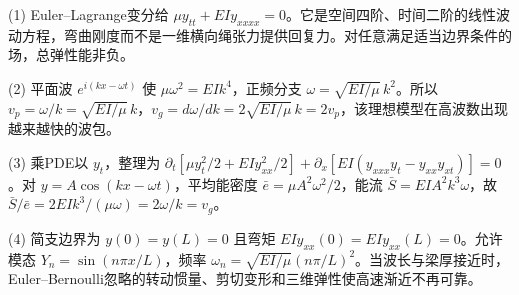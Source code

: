 (1) Euler–Lagrange变分给 \(\boxed{\mu y_{tt}+EI y_{xxxx}=0}\)。它是空间四阶、时间二阶的线性波动方程，弯曲刚度而不是一维横向绳张力提供回复力。对任意满足适当边界条件的场，总弹性能非负。

(2) 平面波 \(e^{i(kx-\omega t)}\) 使 \(\mu\omega^2=EI k^4\)，正频分支 \(\omega=\sqrt{EI/\mu}\,k^2\)。所以 \(v_p=\omega/k=\sqrt{EI/\mu}\,k\)，\(v_g=d\omega/dk=2\sqrt{EI/\mu}\,k=2v_p\)，该理想模型在高波数出现越来越快的波包。

(3) 乘PDE以 \(y_t\)，整理为 \(\partial_t[\mu y_t^2/2+EI y_{xx}^2/2]+\partial_x[EI(y_{xxx}y_t-y_{xx}y_{xt})]=0\)。对 \(y=A\cos(kx-\omega t)\)，平均能密度 \(\bar e=\mu A^2\omega^2/2\)，能流 \(\bar S=EI A^2k^3\omega\)，故 \(\bar S/\bar e=2EI k^3/(\mu\omega)=2\omega/k=v_g\)。

(4) 简支边界为 \(y(0)=y(L)=0\) 且弯矩 \(EI y_{xx}(0)=EI y_{xx}(L)=0\)。允许模态 \(Y_n=\sin(n\pi x/L)\)，频率 \(\boxed{\omega_n=\sqrt{EI/\mu}(n\pi/L)^2}\)。当波长与梁厚接近时，Euler–Bernoulli忽略的转动惯量、剪切变形和三维弹性使高速渐近不再可靠。
